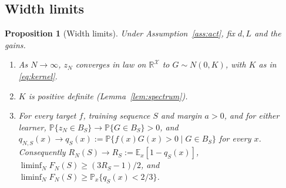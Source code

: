 \documentclass[11pt]{article}
\newtheorem{proposition}[theorem]{Proposition}
\theoremstyle{definition}\newtheorem{assumption}[theorem]{Assumption}
\theoremstyle{remark}\newtheorem{remark}[theorem]{Remark}
\newcommand{\E}{\mathbb E}
\newcommand{\Pp}{\mathbb P}
\newcommand{\X}{\mathcal X}
\newcommand{\R}{\mathbb R}
\begin{document}
\subsection{Width limits}
\begin{proposition}[Width limits]\label{prop:width}
Under Assumption~\ref{ass:act}, fix $d,L$ and the gains.
\begin{enumerate}
\item[(i)] As $N\to\infty$, $z_N$ converges in law on $\R^\X$ to
$G\sim N(0,K)$, with $K$ as in \eqref{eq:kernel}.
\item[(ii)] $K$ is positive definite (Lemma~\ref{lem:spectrum}).
\item[(iii)] For every target $f$, training sequence $S$ and margin $a>0$,
and for either learner, $\Pp\{z_N\in B_S\}\to\Pp\{G\in B_S\}>0$, and
$q_{N,S}(x)\to q_S(x):=\Pp\{f(x)G(x)>0\mid G\in B_S\}$ for every $x$.
Consequently $R_N(S)\to R_S:=\E_x[1-q_S(x)]$,
$\liminf_NF_N(S)\ge(3R_S-1)/2$, and
$\liminf_NF_N(S)\ge\Pp_x\{q_S(x)<2/3\}$.
\end{enumerate}
\end{proposition}
\end{document}
